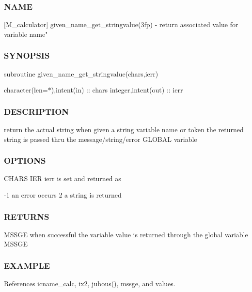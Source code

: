 \subsubsection*{N\+A\+ME}

\mbox{[}M\+\_\+calculator\mbox{]} given\+\_\+name\+\_\+get\+\_\+stringvalue(3fp) -\/ return associated value for variable name" \subsubsection*{S\+Y\+N\+O\+P\+S\+IS}

subroutine given\+\_\+name\+\_\+get\+\_\+stringvalue(chars,ierr)

character(len=$\ast$),intent(in) \+:\+: chars integer,intent(out) \+:\+: ierr \subsubsection*{D\+E\+S\+C\+R\+I\+P\+T\+I\+ON}

return the actual string when given a string variable name or token the returned string is passed thru the message/string/error G\+L\+O\+B\+AL variable \subsubsection*{O\+P\+T\+I\+O\+NS}

C\+H\+A\+RS I\+ER ierr is set and returned as \begin{DoxyVerb}      -1  an error occurs
       2  a string is returned
\end{DoxyVerb}
 \subsubsection*{R\+E\+T\+U\+R\+NS}

M\+S\+S\+GE when successful the variable value is returned through the global variable M\+S\+S\+GE

\subsubsection*{E\+X\+A\+M\+P\+LE}

References icname\+\_\+calc, ix2, jubous(), mssge, and values.

